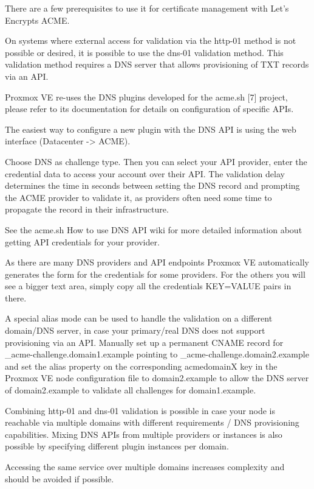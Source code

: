 There are a few prerequisites to use it for certificate management with Let’s Encrypts ACME.

On systems where external access for validation via the http-01 method is not possible or desired, it is possible to use the dns-01 validation method. This validation method requires a DNS server that allows provisioning of TXT records via an API.

Proxmox VE re-uses the DNS plugins developed for the acme.sh [7] project, please refer to its documentation for details on configuration of specific APIs.

The easiest way to configure a new plugin with the DNS API is using the web interface (Datacenter -> ACME).

Choose DNS as challenge type. Then you can select your API provider, enter the credential data to access your account over their API. The validation delay determines the time in seconds between setting the DNS record and prompting the ACME provider to validate it, as providers often need some time to propagate the record in their infrastructure.

See the acme.sh How to use DNS API wiki for more detailed information about getting API credentials for your provider.

As there are many DNS providers and API endpoints Proxmox VE automatically generates the form for the credentials for some providers. For the others you will see a bigger text area, simply copy all the credentials KEY=VALUE pairs in there.

A special alias mode can be used to handle the validation on a different domain/DNS server, in case your primary/real DNS does not support provisioning via an API. Manually set up a permanent CNAME record for _acme-challenge.domain1.example pointing to _acme-challenge.domain2.example and set the alias property on the corresponding acmedomainX key in the Proxmox VE node configuration file to domain2.example to allow the DNS server of domain2.example to validate all challenges for domain1.example.

Combining http-01 and dns-01 validation is possible in case your node is reachable via multiple domains with different requirements / DNS provisioning capabilities. Mixing DNS APIs from multiple providers or instances is also possible by specifying different plugin instances per domain.

Accessing the same service over multiple domains increases complexity and should be avoided if possible.

